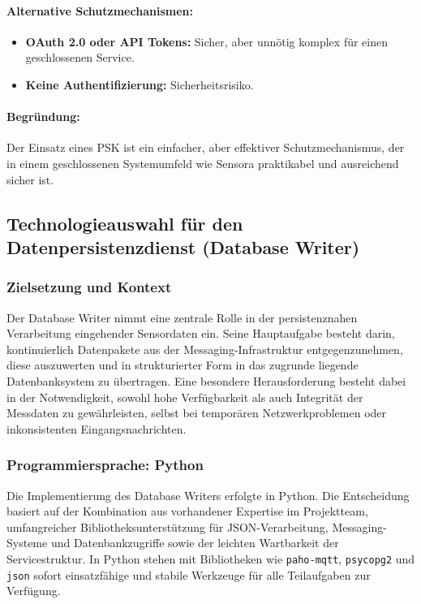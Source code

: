 \paragraph*{Alternative Schutzmechanismen:}
\begin{itemize}
  \item \textbf{OAuth 2.0 oder API Tokens:} Sicher, aber unn\"otig komplex f\"ur einen geschlossenen Service.
  \item \textbf{Keine Authentifizierung:} Sicherheitsrisiko.
\end{itemize}

\paragraph*{Begr\"undung:}

Der Einsatz eines PSK ist ein einfacher, aber effektiver Schutzmechanismus, der in einem geschlossenen Systemumfeld wie Sensora praktikabel und ausreichend sicher ist.

\subsection{Technologieauswahl f\"ur den Datenpersistenzdienst (Database Writer)}

\subsubsection*{Zielsetzung und Kontext}

Der Database Writer nimmt eine zentrale Rolle in der persistenznahen Verarbeitung eingehender Sensordaten ein. Seine Hauptaufgabe besteht darin, kontinuierlich Datenpakete aus der Messaging-Infrastruktur entgegenzunehmen, diese auszuwerten und in strukturierter Form in das zugrunde liegende Datenbanksystem zu \"ubertragen. Eine besondere Herausforderung besteht dabei in der Notwendigkeit, sowohl hohe Verf\"ugbarkeit als auch Integrit\"at der Messdaten zu gew\"ahrleisten, selbst bei tempor\"aren Netzwerkproblemen oder inkonsistenten Eingangsnachrichten.

\subsubsection*{Programmiersprache: Python}

Die Implementierung des Database Writers erfolgte in Python. Die Entscheidung basiert auf der Kombination aus vorhandener Expertise im Projektteam, umfangreicher Bibliotheksunterst\"utzung f\"ur JSON-Verarbeitung, Messaging-Systeme und Datenbankzugriffe sowie der leichten Wartbarkeit der Servicestruktur. In Python stehen mit Bibliotheken wie \texttt{paho-mqtt}\cite{python_mqtt}, \texttt{psycopg2} und \texttt{json} sofort einsatzf\"ahige und stabile Werkzeuge f\"ur alle Teilaufgaben zur Verf\"ugung.

